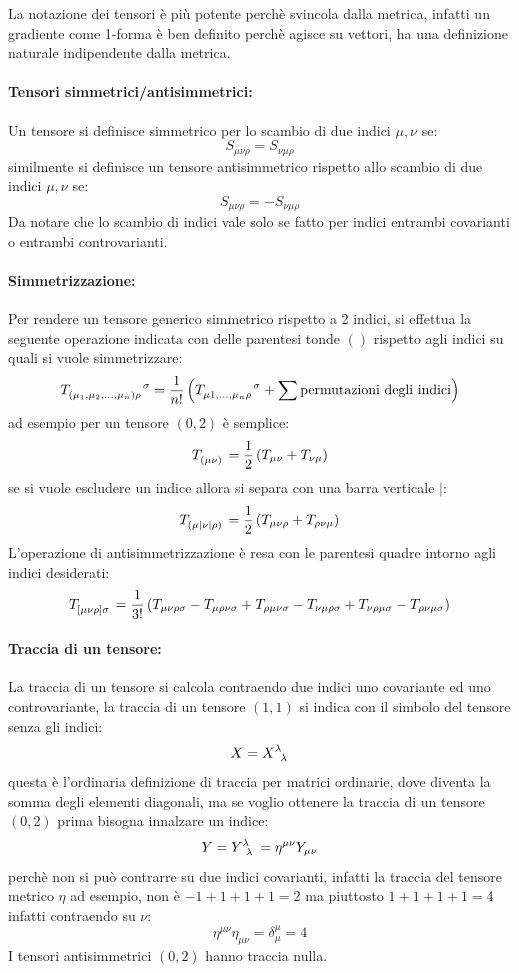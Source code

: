 \documentclass[twoside]{article}
\begin{document}
La notazione dei tensori è più potente perchè svincola dalla metrica, infatti un gradiente come 1-forma è ben definito perchè agisce su vettori, ha una definizione naturale indipendente dalla metrica.
\paragraph{Tensori simmetrici/antisimmetrici:}
Un tensore si definisce simmetrico per lo scambio di due indici $\mu,\nu$ se:
$$
S_{\mu \nu \rho} = S_{\nu \mu \rho}
$$
similmente si definisce un tensore antisimmetrico rispetto allo scambio di due indici $\mu, \nu$ se:
$$
S_{\mu \nu \rho} = - S_{\nu \mu \rho}
$$
Da notare che lo scambio di indici vale solo se fatto per indici entrambi covarianti o entrambi controvarianti.
\paragraph{Simmetrizzazione:}

Per rendere un tensore generico simmetrico rispetto a 2 indici, si effettua la seguente operazione indicata con delle parentesi tonde $()$ rispetto agli indici su quali si vuole simmetrizzare:
$$
T\indices{_{(\mu_1,\mu_2,\ldots,\mu_n)\rho}^\sigma} = \dfrac{1}{n!}\left(T\indices{_{\mu1,\ldots,\mu_n \rho}^\sigma} + \sum\textrm{permutazioni degli indici}\right)
$$
ad esempio per un tensore $(0,2)$ è semplice:
$$
T\indices{_{(\mu \nu)}} = \dfrac{1}{2} \left( T_{\mu \nu} + T_{\nu \mu} \right )
$$
se si vuole escludere un indice allora si separa con una barra verticale $|$:
$$
T\indices{_{(\mu| \nu| \rho)}} = \dfrac{1}{2} \left( T_{\mu \nu \rho } + T_{\rho \nu \mu} \right )
$$
L'operazione di antisimmetrizzazione è resa con le parentesi quadre intorno agli indici desiderati:
$$
T\indices{_{[\mu\nu\rho]\sigma}} = \dfrac{1}{3!} \left( T_{\mu \nu \rho \sigma} - T_{\mu \rho \nu \sigma} + T_{\rho \mu \nu \sigma} -T_{\nu \mu \rho \sigma}  + 
T_{\nu \rho \mu \sigma} - T_{\rho \nu \mu \sigma}\right )
$$
\paragraph{Traccia di un tensore:} La traccia di un tensore si calcola contraendo due indici uno covariante ed uno controvariante, la traccia di un tensore $(1,1)$ si indica con il simbolo del tensore senza gli indici:
$$
X=X\indices{^\lambda_\lambda}
$$
questa è l'ordinaria definizione di traccia per matrici ordinarie, dove diventa la somma degli elementi diagonali, ma se voglio ottenere la traccia di un tensore $(0,2)$ prima bisogna innalzare un indice:
$$ Y = Y\indices{^\lambda_\lambda} = \eta^{\mu \nu}Y_{\mu \nu} $$
perchè non si può contrarre su due indici covarianti, infatti la traccia del tensore metrico $\eta$ ad esempio, non è $-1+1+1+1=2$ ma piuttosto $1+1+1+1=4$ infatti contraendo su $\nu$:
$$ \eta^{\mu \nu}\eta_{\mu \nu} = \delta^{\mu}_{\mu} = 4 $$
I tensori antisimmetrici $(0,2)$ hanno traccia nulla.
\end{document}
